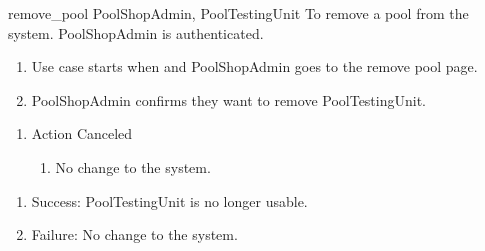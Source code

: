 \usecase
{remove\_pool}
{PoolShopAdmin, PoolTestingUnit}
{To remove a pool from the system.}
{PoolShopAdmin is authenticated.}
{
\begin{enumerate}
\item Use case starts when and PoolShopAdmin goes to the remove pool page.
\item PoolShopAdmin confirms they want to remove PoolTestingUnit.
\end{enumerate}
}
{
\begin{enumerate}
\item Action Canceled
\begin{enumerate}
\item No change to the system.
\end{enumerate}
\end{enumerate}
}
{
\begin{enumerate}
\item Success: PoolTestingUnit is no longer usable.
\item Failure: No change to the system.
\end{enumerate}
}

